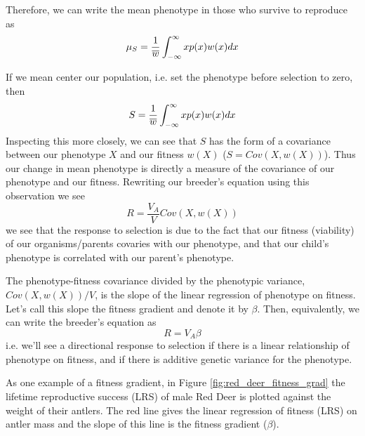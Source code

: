 Therefore, we can write the mean phenotype in those who survive to
reproduce as
\begin{equation}
\mu_S = \frac{1}{\overline{w}}\int_{-\infty}^{\infty} x p(x) w(x) dx
\end{equation}

If we mean center our population, i.e. set the phenotype before
selection to zero, then
\begin{equation}
S= \frac{1}{\overline{w}}\int_{-\infty}^{\infty} x p(x) w(x) dx
\end{equation}
Inspecting this more closely, we can see that $S$ has
the form of a covariance between our phenotype $X$ and our fitness
$w(X)$ ($S = Cov(X, w(X))$). Thus our change in mean phenotype is directly a measure of the
covariance of our phenotype and our fitness. Rewriting our breeder's
equation using this observation we see
\begin{equation}
R = \frac{V_A}{V}  Cov(X,w(X))
\end{equation}
we see that the response to selection is due to the fact that our
fitness (viability) of our organisms/parents covaries with our phenotype, and
that our child's phenotype is correlated with our parent's phenotype. 

The phenotype-fitness covariance divided by the phenotypic variance, $Cov(X,w(X))/ V$, is the slope of the linear regression of phenotype on fitness. Let's call this slope the fitness gradient and denote it by $\beta$. Then, equivalently, we can write the breeder's equation as
\begin{equation}
R= V_A \beta
\end{equation}
i.e. we'll see a directional response to selection if there is a linear relationship of phenotype on fitness, and if there is additive genetic variance for the phenotype. 

As one example of a fitness gradient, in Figure \ref{fig:red_deer_fitness_grad}  the lifetime reproductive success (LRS) of male Red Deer is plotted against the weight of their antlers. The red line gives the linear regression of fitness (LRS) on antler mass and the slope of this line is the fitness gradient ($\beta$). 

